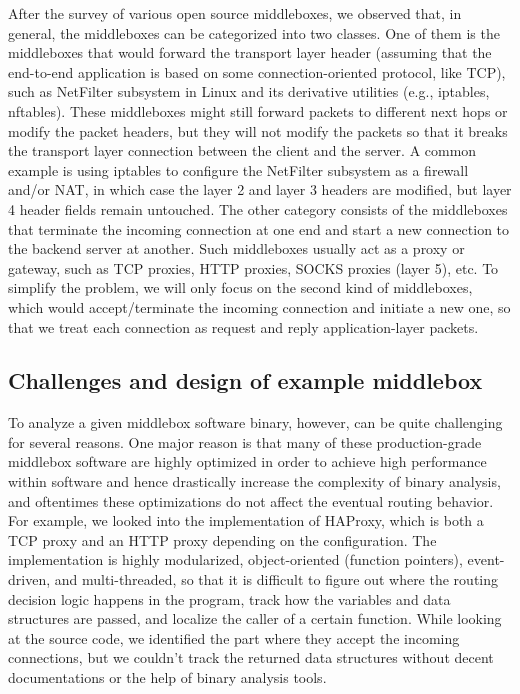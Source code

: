 After the survey of various open source middleboxes, we observed that, in
general, the middleboxes can be categorized into two classes. One of them is the
middleboxes that would forward the transport layer header (assuming that the
end-to-end application is based on some connection-oriented protocol, like TCP),
such as NetFilter subsystem in Linux and its derivative utilities (e.g.,
iptables, nftables). These middleboxes might still forward packets to different
next hops or modify the packet headers, but they will not modify the packets so
that it breaks the transport layer connection between the client and the server.
A common example is using iptables to configure the NetFilter subsystem as a
firewall and/or NAT, in which case the layer 2 and layer 3 headers are modified,
but layer 4 header fields remain untouched. The other category consists of the
middleboxes that terminate the incoming connection at one end and start a new
connection to the backend server at another. Such middleboxes usually act as a
proxy or gateway, such as TCP proxies, HTTP proxies, SOCKS proxies (layer 5),
etc. To simplify the problem, we will only focus on the second kind of
middleboxes, which would accept/terminate the incoming connection and initiate a
new one, so that we treat each connection as request and reply application-layer
packets.

\subsection{Challenges and design of example middlebox}

To analyze a given middlebox software binary, however, can be quite challenging
for several reasons. One major reason is that many of these production-grade
middlebox software are highly optimized in order to achieve high performance
within software and hence drastically increase the complexity of binary
analysis, and oftentimes these optimizations do not affect the eventual routing
behavior. For example, we looked into the implementation of HAProxy, which is
both a TCP proxy and an HTTP proxy depending on the configuration. The
implementation is highly modularized, object-oriented (function pointers),
event-driven, and multi-threaded, so that it is difficult to figure out where
the routing decision logic happens in the program, track how the variables and
data structures are passed, and localize the caller of a certain function. While
looking at the source code, we identified the part where they accept the
incoming connections, but we couldn't track the returned data structures without
decent documentations or the help of binary analysis tools.

